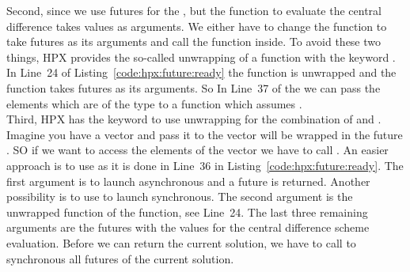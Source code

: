 \documentclass[11pt,fleqn]{book} %
\begin{document}
Second, since we use futures for the , but the function to evaluate the central difference  takes  values as arguments. We either have to change the function to take futures as its arguments and call the  function inside. To avoid these two things, HPX provides the so-called unwrapping of a function with the keyword . In Line~24 of Listing~\ref{code:hpx:future:ready} the function  is unwrapped and the function  takes futures as its arguments. So In Line~37 of the  we can pass the  elements which are of the type  to a function which assumes .\\

Third, HPX has the keyword  to use unwrapping for the combination of  and . Imagine you have a vector  and pass it to  the vector  will be wrapped in the future . SO if we want to access the elements of the vector we have to call . An easier approach is to use  as it is done in Line~36 in Listing~\ref{code:hpx:future:ready}. The first argument is  to launch asynchronous and a future is returned. Another possibility is to use  to launch synchronous. The second argument is the unwrapped function of the  function, see Line~24. The last three remaining arguments are the futures with the values for the central difference scheme evaluation. Before we can return the current solution, we have to call  to synchronous all futures of the current solution.
\end{document}
